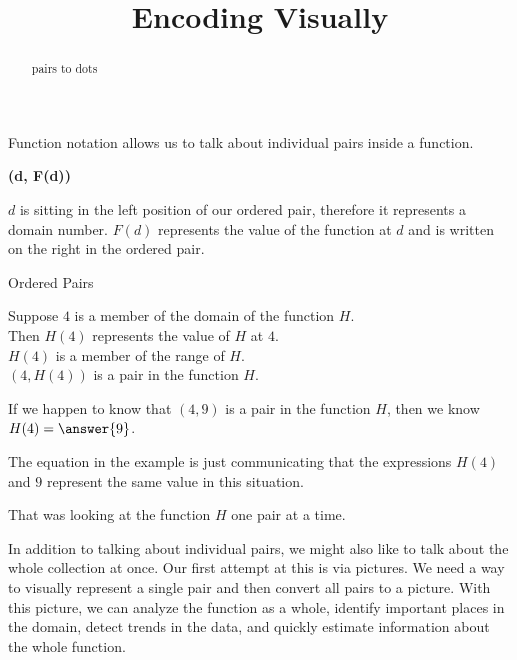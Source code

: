 \documentclass{ximera}
\title{Encoding Visually}
\begin{document}
\begin{abstract}
pairs to dots
\end{abstract}
\maketitle


Function notation allows us to talk about individual pairs inside a function.


\begin{center}
\textbf{\textcolor{purple!85!blue}{(d, F(d))}}
\end{center}




$d$ is sitting in the left position of our ordered pair, therefore it represents a domain number. $F(d)$ represents the value of the function at $d$ and is written on the right in the ordered pair.


\begin{example} Ordered Pairs

Suppose $4$ is a member of the domain of the function $H$. \\
Then $H(4)$ represents the value of $H$ at $4$. \\
$H(4)$ is a member of the range of $H$. \\
$(4, H(4))$ is a pair in the function $H$.

If we happen to know that $(4, 9)$ is a pair in the function $H$, then we know $H(4) = \answer{9}$.

\end{example}

The equation in the example is just communicating that the expressions $H(4)$ and $9$ represent the same value in this situation. 

That was looking at the function $H$ one pair at a time. 


In addition to talking about individual pairs, we might also like to talk about the whole collection at once.  Our first attempt at this is via pictures. We need a way to visually represent a single pair and then convert all pairs to a picture.  With this picture, we can analyze the function as a whole, identify important places in the domain, detect trends in the data, and quickly estimate information about the whole function.
\end{document}
